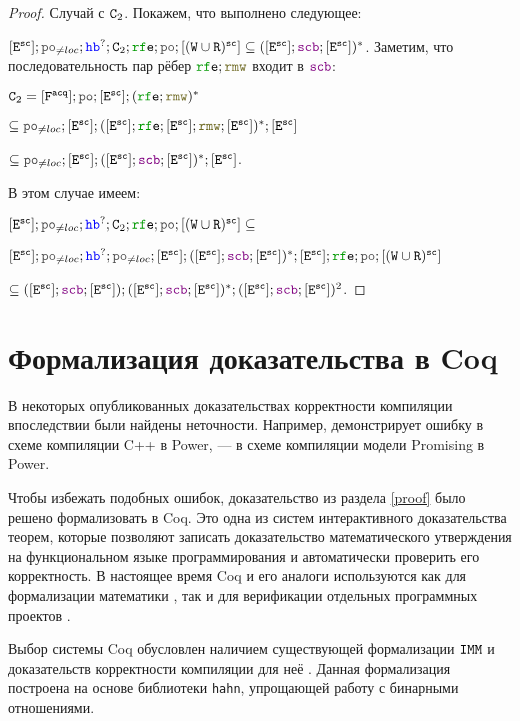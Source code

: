 \begin{proof}
    Случай с $\mathtt{C}_2$. Покажем, что выполнено следующее:

    $[\lE^{\sco}]; \lPO_{\neq loc} ; \lHB^?; \CA_2; \lRFE; \lPO ; [(\lW \cup \lR)^{\sco}]\subseteq  ([\lE^{\sco}] ; \lSCB ; [\lE^{\sco}])^{*}$. Заметим, что последовательность пар рёбер $\lRFE ; \lRMW$ входит в $\lSCB$: 

    $\CA_2=[\Fa] ; \lPO ; [\lE^{\sco}] ; (\lRFE ; \lRMW)^{*} $

    $\subseteq \lPO_{\neq loc}; [\lE^{\sco}] ; ([\lE^{\sco}] ; \lRFE; [\lE^{\sco}];  \lRMW; [\lE^{\sco}])^{*}; [\lE^{\sco}]$

    $\subseteq \lPO_{\neq loc}; [\lE^{\sco}] ; ([\lE^{\sco}] ; \lSCB ; [\lE^{\sco}])^{*}; [\lE^{\sco}]$.

    В этом случае имеем:

    \noindent $[\lE^{\sco}]; \lPO_{\neq loc} ; \lHB^?; \CA_2; \lRFE; \lPO ; [(\lW \cup \lR)^{\sco}]\subseteq$

    \noindent $[\lE^{\sco}]; \lPO_{\neq loc} ; \lHB^?; \lPO_{\neq loc}; [\lE^{\sco}] ; ([\lE^{\sco}] ; \lSCB ; [\lE^{\sco}])^{*}; [\lE^{\sco}]; \lRFE; \lPO ; [(\lW \cup \lR)^{\sco}]$

    \noindent $\subseteq ([\lE^{\sco}] ; \lSCB ; [\lE^{\sco}]) ; ([\lE^{\sco}] ; \lSCB ; [\lE^{\sco}])^{*}; ([\lE^{\sco}] ; \lSCB ; [\lE^{\sco}])^2$. \qedhere  
  
\end{proof}

\section{Формализация доказательства в Coq}

В некоторых опубликованных доказательствах корректности компиляции впоследствии были найдены неточности. Например, \cite{rc11} демонстрирует ошибку в схеме компиляции C++ в Power, \cite{imm} --- в схеме компиляции модели Promising в Power.

Чтобы избежать подобных ошибок, доказательство из раздела \ref{proof} было решено формализовать в Coq. Это одна из систем интерактивного доказательства теорем, которые позволяют записать доказательство математического утверждения на функциональном языке программирования и автоматически проверить его корректность. В настоящее время Coq и его аналоги используются как для формализации математики \cite{four-color}, так и для верификации отдельных программных проектов \cite{compcert}. 

Выбор системы Coq обусловлен наличием существующей формализации $\mathtt{IMM}$ и доказательств корректности компиляции для неё \cite{imm-repo}. Данная формализация построена на основе библиотеки \texttt{hahn}, упрощающей работу с бинарными отношениями.

